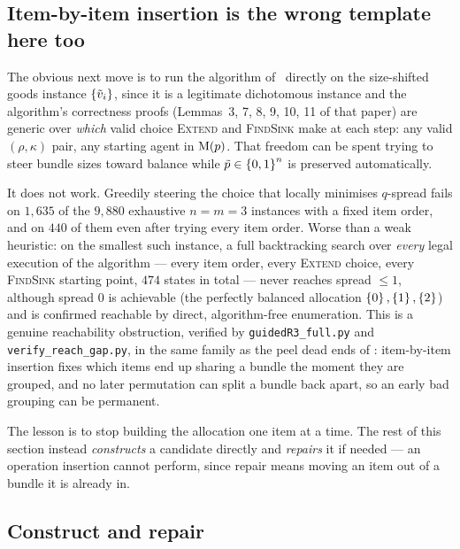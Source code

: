 \subsection{Item-by-item insertion is the wrong template here too}
\label{sec:insertion-fails-goods}

The obvious next move is to run the algorithm of~\cite{BKNS22} directly on the
size-shifted goods instance $\left\{\tilde{v}_i\right\}$, since it is a legitimate
dichotomous instance and the algorithm's correctness proofs
(Lemmas~3, 7, 8, 9, 10, 11 of that paper) are generic over \emph{which} valid
choice \textsc{Extend} and \textsc{FindSink} make at each step: any valid
$(\rho, \kappa)$ pair, any starting agent in $\mathrm{M}(p)$. That freedom can
be spent trying to steer bundle sizes toward balance while $\tilde{p} \in
\left\{0,1\right\}^n$ is preserved automatically.

It does not work. Greedily steering the choice that locally minimises $q$-spread
fails on $1{,}635$ of the $9{,}880$ exhaustive $n=m=3$ instances with a fixed
item order, and on $440$ of them even after trying every item order. Worse than
a weak heuristic: on the smallest such instance, a full backtracking search over
\emph{every} legal execution of the algorithm --- every item order, every
\textsc{Extend} choice, every \textsc{FindSink} starting point, $474$ states in
total --- never reaches spread $\le 1$, although spread $0$ is achievable (the
perfectly balanced allocation $\left\{0\right\},\left\{1\right\},\left\{2\right\}$) and is confirmed
reachable by direct, algorithm-free enumeration. This is a genuine reachability
obstruction, verified by \texttt{guidedR3\_full.py} and
\texttt{verify\_reach\_gap.py}, in the same family as the peel dead ends of
: item-by-item insertion fixes which items end up sharing a
bundle the moment they are grouped, and no later permutation can split a bundle
back apart, so an early bad grouping can be permanent.

The lesson is to stop building the allocation one item at a time. The rest of
this section instead \emph{constructs} a candidate directly and \emph{repairs}
it if needed --- an operation insertion cannot perform, since repair means
moving an item out of a bundle it is already in.

\subsection{Construct and repair}
\label{sec:construct-repair}


